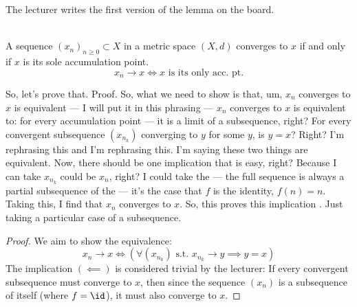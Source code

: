 \begin{math-stroke}
\begin{nice-box}
The lecturer writes the first version of the lemma on the board.
\end{nice-box}
\begin{lemma}\label{lem:convergence-acc-point-v1}
\textcolor{red}{} \\
A sequence $(x_n)_{n \ge 0} \subset X$ in a metric space $(X, d)$ converges to $x$ if and only if $x$ is its sole accumulation point.
\[ x_n \to x \iff x \text{ is its only acc. pt.} \]
\end{lemma}
\end{math-stroke}

\begin{spoken-clean}[00:05:04 - 00:06:50]
So, let's prove that. Proof.  So, what we need to show is that, um, $x_n$ converges to $x$ is equivalent — I will put it in this phrasing — $x_n$ converges to $x$ is equivalent to: for every accumulation point — it is a limit of a subsequence, right? For every convergent subsequence $(x_{n_k})$ converging to $y$ for some $y$, is $y = x$? Right? I'm rephrasing this and I'm rephrasing this. I'm saying these two things are equivalent. Now, there should be one implication that is easy, right? Because I can take $x_{n_k}$ could be $x_n$, right? I could take the — the full sequence is always a partial subsequence of the — it's the case that $f$ is the identity, $f(n) = n$. Taking this, I find that $x_n$ converges to $x$. So, this proves this implication . Just taking a particular case of a subsequence.
\end{spoken-clean}


\begin{math-stroke}
\begin{proof}
We aim to show the equivalence:
\[ x_n \to x \iff \left( \forall (x_{n_k}) \text{ s.t. } x_{n_k} \to y \implies y = x \right) \]
The implication $(\impliedby)$ is considered trivial by the lecturer:
If every convergent subsequence must converge to $x$, then since the sequence $(x_n)$ is a subsequence of itself (where $f = \id$), it must also converge to $x$.
\end{proof}
\end{math-stroke}

